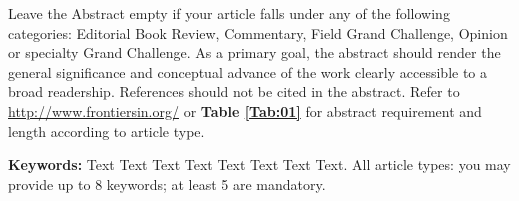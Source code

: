 Leave the Abstract empty if your article falls under any of the following categories: Editorial Book Review, Commentary, Field Grand Challenge, Opinion or specialty Grand Challenge. As a primary goal, the abstract should render the general significance and conceptual advance of the work clearly accessible to a broad readership. References should not be cited in the abstract. Refer to  \url{http://www.frontiersin.org/} or \textbf{Table \ref{Tab:01}} for abstract requirement and length according to article type.


\textbf{Keywords:} Text Text Text Text Text Text Text Text. All article types: you may provide up to 8 keywords; at least 5 are mandatory.
